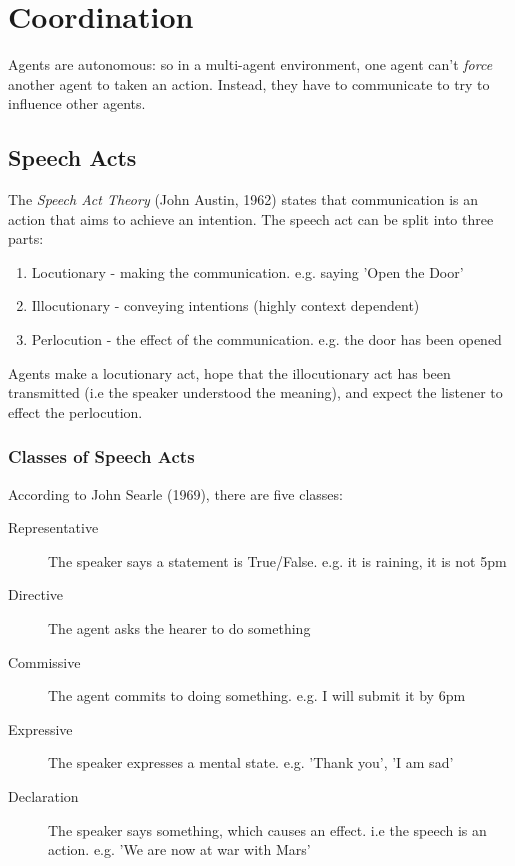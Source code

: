 \section{Coordination}

Agents are autonomous: so in a multi-agent environment, one agent can't \emph{force} another agent to taken an action. Instead, they have to communicate to try to influence other agents.

\subsection{Speech Acts}
The \emph{Speech Act Theory} (John Austin, 1962) states that communication is an action that aims to achieve an intention. The speech act can be split into three parts:
\begin{enumerate}
    \item Locutionary - making the communication. e.g. saying 'Open the Door'
    \item Illocutionary - conveying intentions (highly context dependent)
    \item Perlocution - the effect of the communication. e.g. the door has been opened
\end{enumerate}
Agents make a locutionary act, hope that the illocutionary act has been transmitted (i.e the speaker understood the meaning), and expect the listener to effect the perlocution. 

\subsubsection{Classes of Speech Acts}
According to John Searle (1969), there are five classes:
\begin{description}
    \item [Representative] The speaker says a statement is True/False. e.g. it is raining, it is not 5pm
    \item [Directive] The agent asks the hearer to do something
    \item [Commissive] The agent commits to doing something. e.g. I will submit it by 6pm
    \item [Expressive] The speaker expresses a mental state. e.g. 'Thank you', 'I am sad'
    \item [Declaration] The speaker says something, which causes an effect. i.e the speech is an action. e.g. 'We are now at war with Mars'
\end{description}

